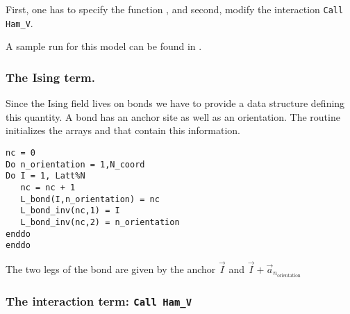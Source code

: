 First,  one has to specify the function , and  second,  modify the interaction \texttt{Call Ham\_V}.

A sample run for this model can be found in .


\subsubsection{The Ising term.}
Since the Ising field lives on bonds we have to provide a data structure defining this quantity.  A bond has an anchor site as well as an orientation. The routine    initializes  the arrays  and   that contain this information.
\begin{lstlisting}[style=fortran]
nc = 0
Do n_orientation = 1,N_coord
Do I = 1, Latt%N
   nc = nc + 1
   L_bond(I,n_orientation) = nc
   L_bond_inv(nc,1) = I    
   L_bond_inv(nc,2) = n_orientation
enddo
enddo
\end{lstlisting}
The two legs of the bond are given by  the anchor $\vec{I}$ and $\vec{I}+ \vec{a}_{n_\text{orientation}}$
\subsubsection{The interaction term: \texttt{Call Ham\_V}}

